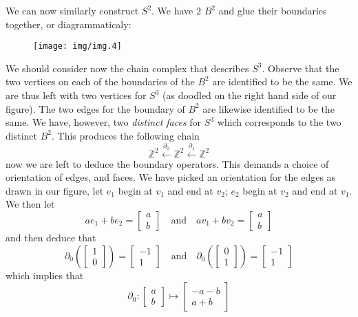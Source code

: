 We can now similarly construct $S^{2}$. We have 2 $B^{2}$ and glue their
boundaries together, or diagrammaticaly:
\begin{figure}[H]
\texttt{[image: img/img.4]}
\end{figure}
\noindent We should consider now the chain complex that describes
$S^{3}$. Observe that the two vertices on each of the boundaries
of the $B^{2}$ are identified to be the same. We are thus left
with two vertices for $S^{3}$ (as doodled on the right hand side
of our figure). The two edges for the boundary of $B^{2}$ are
likewise identified to be the same. We have, however, two
\emph{distinct faces} for $S^{3}$ which corresponds to the two
distinct $B^{2}$. This produces the following chain
\begin{equation}%
\mathbb{Z}^{2}\xleftarrow{\partial_{0}}\mathbb{Z}^{2}\xleftarrow{\partial_{1}}\mathbb{Z}^{2}
\end{equation}
now we are left to deduce the boundary operators. This demands a
choice of orientation of edges, and faces. We have picked an
orientation for the edges as drawn in our figure, let $e_{1}$
begin at $v_{1}$ and end at $v_{2}$; $e_{2}$ begin at $v_{2}$ and
end at $v_{1}$. We then let
\begin{equation}%
ae_{1}+be_{2}=\begin{bmatrix}a\\b\end{bmatrix}\quad\text{and}\quad 
av_{1}+bv_{2}=\begin{bmatrix}a\\b\end{bmatrix}
\end{equation}
and then deduce that
\begin{equation}%
\partial_{0}\left(\begin{bmatrix}1\\0\end{bmatrix}\right)=\begin{bmatrix}-1\\1\end{bmatrix}\quad\text{and}\quad
\partial_{0}\left(\begin{bmatrix}0\\1\end{bmatrix}\right)=\begin{bmatrix}-1\\1\end{bmatrix}
\end{equation}
which implies that
\begin{equation}%
\partial_{0}:\begin{bmatrix}a\\b\end{bmatrix}\mapsto\begin{bmatrix}-a-b\\a+b\end{bmatrix}
\end{equation}
